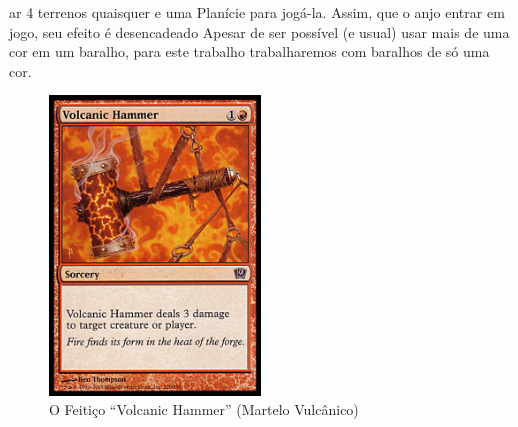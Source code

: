 ar 4 terrenos quaisquer e uma Planície para jogá-la. Assim, que o anjo entrar em jogo, seu efeito é desencadeado Apesar de ser possível (e usual) usar mais de uma cor em um baralho, para este trabalho trabalharemos com baralhos de só uma cor.

\begin{figure}[!h]
  \centering
  \includegraphics[width=0.5\textwidth]{picstcc/volcanicfull.png}
  \caption{O Feitiço ``Volcanic Hammer'' (Martelo Vulcânico)}
  \label{volcanicsorcery}
\end{figure}

